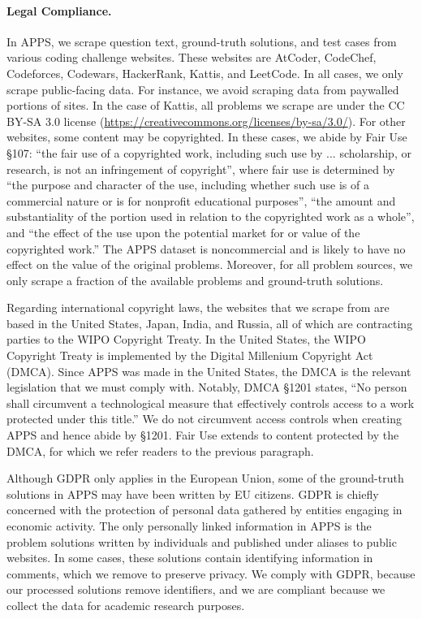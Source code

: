 \documentclass{article}
\begin{document}
\paragraph{Legal Compliance.}
In APPS, we scrape question text, ground-truth solutions, and test cases from various coding challenge websites. These websites are AtCoder, CodeChef, Codeforces, Codewars, HackerRank, Kattis, and LeetCode. In all cases, we only scrape public-facing data. For instance, we avoid scraping data from paywalled portions of sites. In the case of Kattis, all problems we scrape are under the CC BY-SA 3.0 license (\href{https://creativecommons.org/licenses/by-sa/3.0/}{https://creativecommons.org/licenses/by-sa/3.0/}). For other websites, some content may be copyrighted. In these cases, we abide by Fair Use §107: ``the fair use of a copyrighted work, including such use by ... scholarship, or research, is not an infringement of copyright'', where fair use is determined by ``the purpose and character of the use, including whether such use is of a commercial nature or is for nonprofit educational purposes'', ``the amount and substantiality of the portion used in relation to the copyrighted work as a whole'', and ``the effect of the use upon the potential market for or value of the copyrighted work.'' The APPS dataset is noncommercial and is likely to have no effect on the value of the original problems. Moreover, for all problem sources, we only scrape a fraction of the available problems and ground-truth solutions.

Regarding international copyright laws, the websites that we scrape from are based in the United States, Japan, India, and Russia, all of which are contracting parties to the WIPO Copyright Treaty. In the United States, the WIPO Copyright Treaty is implemented by the Digital Millenium Copyright Act (DMCA). Since APPS was made in the United States, the DMCA is the relevant legislation that we must comply with. Notably, DMCA §1201 states, ``No person shall circumvent a technological measure that effectively controls access to a work protected under this title.'' We do not circumvent access controls when creating APPS and hence abide by §1201. Fair Use extends to content protected by the DMCA, for which we refer readers to the previous paragraph.

Although GDPR only applies in the European Union, some of the ground-truth solutions in APPS may have been written by EU citizens. GDPR is chiefly concerned with the protection of personal data gathered by entities engaging in economic activity. The only personally linked information in APPS is the problem solutions written by individuals and published under aliases to public websites. In some cases, these solutions contain identifying information in comments, which we remove to preserve privacy. We comply with GDPR, because our processed solutions remove identifiers, and we are compliant because we collect the data for academic research purposes.
\end{document}
